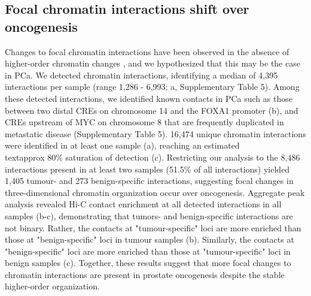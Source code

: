 \subsection{Focal chromatin interactions shift over oncogenesis}

Changes to focal chromatin interactions have been observed in the absence of higher-order chromatin changes \cite{takayamaTransitionQuiescentActivated2021,johnstoneLargeScaleTopologicalChanges2020}, and we hypothesized that this may be the case in PCa.
We detected chromatin interactions, identifying a median of 4,395 interactions per sample (range 1,286 - 6,993; a, Supplementary Table 5).
Among these detected interactions, we identified known contacts in PCa such as those between two distal CREs on chromosome 14 and the FOXA1 promoter \cite{zhouNoncodingMutationsTarget2020} (b), and CREs upstream of MYC on chromosome 8 that are frequently duplicated in metastatic disease \cite{quigleyGenomicHallmarksStructural2018} (Supplementary Table 5).
16,474 unique chromatin interactions were identified in at least one sample (a), reaching an estimated \\textapprox 80\% saturation of detection (c).
Restricting our analysis to the 8,486 interactions present in at least two samples (51.5\% of all interactions) yielded 1,405 tumour- and 273 benign-specific interactions, suggesting focal changes in three-dimensional chromatin organization occur over oncogenesis.
Aggregate peak analysis revealed Hi-C contact enrichment at all detected interactions in all samples (b-c), demonstrating that tumors- and benign-specific interactions are not binary.
Rather, the contacts at "tumour-specific" loci are more enriched than those at "benign-specific" loci in tumour samples (b).
Similarly, the contacts at "benign-specific" loci are more enriched than those at "tumour-specific" loci in benign samples (c).
Together, these results suggest that more focal changes to chromatin interactions are present in prostate oncogenesis despite the stable higher-order organization.


